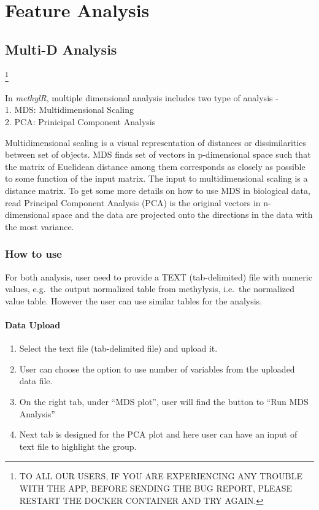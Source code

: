 \documentclass[
  a4paper,
  oneside,
  open=any]{scrreport}
\providecommand{\tightlist}{%
  \setlength{\itemsep}{0pt}\setlength{\parskip}{0pt}}\usepackage{longtable,booktabs,array}
\begin{document}
\part{Feature Analysis}

\hypertarget{sec-multid}{%
\chapter{Multi-D Analysis}\label{sec-multid}}

\footnote{TO ALL OUR USERS, IF YOU ARE EXPERIENCING ANY TROUBLE WITH THE
  APP, BEFORE SENDING THE BUG REPORT, PLEASE RESTART THE DOCKER
  CONTAINER AND TRY AGAIN.}

In \emph{methylR}, multiple dimensional analysis includes two type of
analysis -\\
1. MDS: Multidimensional Scaling\\
2. PCA: Prinicipal Component Analysis

Multidimensional scaling is a visual representation of distances or
dissimilarities between set of objects. MDS finds set of vectors in
p-dimensional space such that the matrix of Euclidean distance among
them corresponds as closely as possible to some function of the input
matrix. The input to multidimensional scaling is a distance matrix. To
get some more details on how to use MDS in biological data, read
\autocite{mugavin2008multidimensional,lacher1987interpretation,lacher1988comparison}
Principal Component Analysis (PCA) is the original vectors in
n-dimensional space and the data are projected onto the directions in
the data with the most variance.

\hypertarget{how-to-use-2}{%
\section{How to use}\label{how-to-use-2}}

For both analysis, user need to provide a TEXT (tab-delimited) file with
numeric values, e.g.~the output normalized table from methylysis,
i.e.~the normalized \beta value table. However the user can use similar
tables for the analysis.

\hypertarget{data-upload}{%
\subsection{Data Upload}\label{data-upload}}

\begin{enumerate}
\def\labelenumi{\arabic{enumi}.}
\tightlist
\item
  Select the text file (tab-delimited file) and upload it.
\item
  User can choose the option to use number of variables from the
  uploaded data file.
\item
  On the right tab, under ``MDS plot'', user will find the button to
  ``Run MDS Analysis''
\item
  Next tab is designed for the PCA plot and here user can have an input
  of text file to highlight the group.
\end{enumerate}
\end{document}
